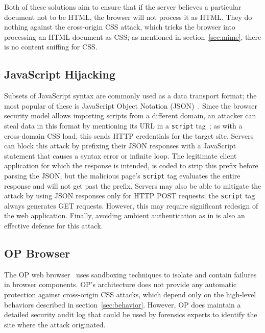 \documentclass{acm_proc_article-sp}
\begin{document}
Both of these solutions aim to ensure that if the server believes a
particular document not to be HTML, the browser will not process it as
HTML.  They do nothing against the cross-origin CSS attack, which
tricks the browser into processing an HTML document as CSS; as
mentioned in section~\ref{sec:mime}, there is no content sniffing for
CSS.

\subsection{JavaScript Hijacking}
Subsets of JavaScript syntax are commonly used as a data transport
format; the most popular of these is JavaScript Object Notation
(JSON)~\cite{json}.  Since the browser security model allows importing
scripts from a different domain, an attacker can steal data in this
format by mentioning its URL in a \texttt{script}
tag~\cite{jshijacking}; as with a cross-domain CSS load, this sends
HTTP credentials for the target site.  Servers can block this attack
by prefixing their JSON responses with a JavaScript statement that
causes a syntax error or infinite loop.  The legitimate client
application for which the response is intended, is coded to strip this
prefix before parsing the JSON, but the malicious page's
\texttt{script} tag evaluates the entire response and will not get
past the prefix.  Servers may also be able to mitigate the attack by
using JSON responses only for HTTP POST requests; the \texttt{script}
tag always generates GET requests.  However, this may require
significant redesign of the web application.  Finally, avoiding
ambient authentication as in \cite{webkey} is also an effective
defense for this attack. 

\subsection{OP Browser}
The OP web browser~\cite{op-browser} uses sandboxing techniques to
isolate and contain failures in browser components.  OP's architecture
does not provide any automatic protection against cross-origin CSS
attacks, which depend only on the high-level behaviors described in
section~\ref{sec:behavior}.  However, OP does maintain a detailed
security audit log that could be used by forensics experts to identify
the site where the attack originated.
\end{document}

